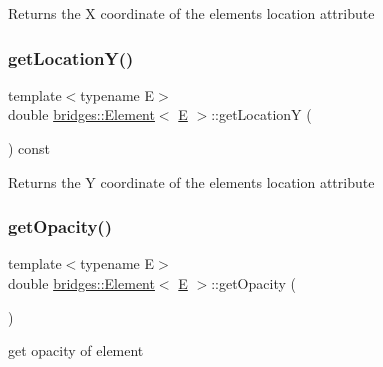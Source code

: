 \begin{DoxyReturn}{Returns}
the X coordinate of the element\textquotesingle{}s location attribute 
\end{DoxyReturn}
\mbox{\label{classbridges_1_1_element_a55ae0ef486ea19ca951b1604f1abb9df}} 
\subsubsection{\texorpdfstring{getLocationY()}{getLocationY()}}
{\footnotesize\ttfamily template$<$typename E$>$ \\
double \mbox{\hyperlink{classbridges_1_1_element}{bridges\+::\+Element}}$<$ \mbox{\hyperlink{namespacebridges_acfb0a4f7877d8f63de3e6862004c50eda3a3ea00cfc35332cedf6e5e9a32e94da}{E}} $>$\+::get\+LocationY (\begin{DoxyParamCaption}{ }\end{DoxyParamCaption}) const\hspace{0.3cm}{\ttfamily [inline]}}

\begin{DoxyReturn}{Returns}
the Y coordinate of the element\textquotesingle{}s location attribute 
\end{DoxyReturn}
\mbox{\label{classbridges_1_1_element_a71e157e0423b48c777ad3421fae01ee2}} 
\subsubsection{\texorpdfstring{getOpacity()}{getOpacity()}}
{\footnotesize\ttfamily template$<$typename E$>$ \\
double \mbox{\hyperlink{classbridges_1_1_element}{bridges\+::\+Element}}$<$ \mbox{\hyperlink{namespacebridges_acfb0a4f7877d8f63de3e6862004c50eda3a3ea00cfc35332cedf6e5e9a32e94da}{E}} $>$\+::get\+Opacity (\begin{DoxyParamCaption}{ }\end{DoxyParamCaption})\hspace{0.3cm}{\ttfamily [inline]}}

get opacity of element

